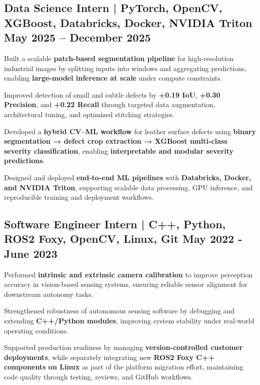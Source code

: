 
\subsection{{Data Science Intern |  PyTorch, OpenCV, XGBoost, Databricks, Docker, NVIDIA Triton \hfill May 2025 -- December 2025}}
\begin{zitemize}
    \item Built a scalable \textbf{patch-based segmentation pipeline} for high-resolution industrial images by splitting inputs into windows and aggregating predictions, enabling \textbf{large-model inference at scale} under compute constraints.

    \item Improved detection of small and subtle defects by \textbf{+0.19 IoU}, \textbf{+0.30 Precision}, and \textbf{+0.22 Recall} through targeted data augmentation, architectural tuning, and optimized stitching strategies.

    \item Developed a \textbf{hybrid CV--ML workflow} for leather surface defects using \textbf{binary segmentation → defect crop extraction → XGBoost multi-class severity classification}, enabling \textbf{interpretable and modular severity predictions}.

    \item Designed and deployed \textbf{end-to-end ML pipelines} with \textbf{Databricks, Docker, and NVIDIA Triton}, supporting scalable data processing, GPU inference, and reproducible training and deployment workflows.


\end{zitemize}




\subsection{{Software Engineer Intern | C++, Python, ROS2 Foxy, OpenCV, Linux, Git \hfill May 2022 - June 2023}}
\begin{zitemize}
    \item Performed \textbf{intrinsic and extrinsic camera calibration} to improve perception accuracy in vision-based sensing systems, ensuring reliable sensor alignment for downstream autonomy tasks.

    \item Strengthened robustness of autonomous sensing software by debugging and extending \textbf{C++/Python modules}, improving system stability under real-world operating conditions.

    \item Supported production readiness by managing \textbf{version-controlled customer deployments}, while separately integrating new \textbf{ROS2 Foxy C++ components on Linux} as part of the platform migration effort, maintaining code quality through testing, reviews, and GitHub workflows.
\end{zitemize}



